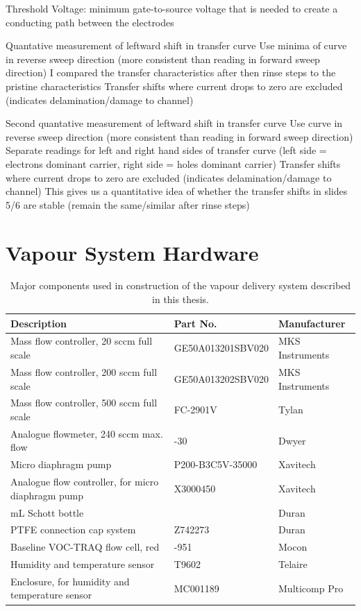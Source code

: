 \documentclass[
  a4paper,
]{scrbook}
\begin{document}
Threshold Voltage: minimum gate-to-source voltage that is needed to
create a conducting path between the electrodes

Quantative measurement of leftward shift in transfer curve Use minima of
curve in reverse sweep direction (more consistent than reading in
forward sweep direction) I compared the transfer characteristics after
then rinse steps to the pristine characteristics Transfer shifts where
current drops to zero are excluded (indicates delamination/damage to
channel)

Second quantative measurement of leftward shift in transfer curve Use
curve in reverse sweep direction (more consistent than reading in
forward sweep direction) Separate readings for left and right hand sides
of transfer curve (left side = electrons dominant carrier, right side =
holes dominant carrier) Transfer shifts where current drops to zero are
excluded (indicates delamination/damage to channel) This gives us a
quantitative idea of whether the transfer shifts in slides 5/6 are
stable (remain the same/similar after rinse steps)

\cleardoublepage
{}
{}
\appendix

\hypertarget{sec-vapour-sensor-components}{%
\chapter{Vapour System Hardware}\label{sec-vapour-sensor-components}}

\hypertarget{tbl-vapour-sensor-components}{}
\begin{longtable}[t]{>{\raggedright\arraybackslash}p{5.5cm}>{\raggedright\arraybackslash}p{4.5cm}>{\raggedright\arraybackslash}p{3.75cm}}
\caption{\label{tbl-vapour-sensor-components}Major components used in construction of the vapour delivery system
described in this thesis. }\tabularnewline

\toprule
Description & Part No. & Manufacturer\\
\midrule
Mass flow controller, 20 sccm full scale & GE50A013201SBV020 & MKS Instruments\\
Mass flow controller, 200 sccm full scale & GE50A013202SBV020 & MKS Instruments\\
Mass flow controller, 500 sccm full scale & FC-2901V & Tylan\\
Analogue flowmeter, 240 sccm max. flow & 116261-30 & Dwyer\\
Micro diaphragm pump & P200-B3C5V-35000 & Xavitech\\
\addlinespace
Analogue flow controller, for micro diaphragm pump & X3000450 & Xavitech\\
10 mL Schott bottle & 218010802 & Duran\\
PTFE connection cap system & Z742273 & Duran\\
Baseline VOC-TRAQ flow cell, red & 043-951 & Mocon\\
Humidity and temperature sensor & T9602 & Telaire\\
\addlinespace
Enclosure, for humidity and temperature sensor & MC001189 & Multicomp Pro\\
\bottomrule
\end{longtable}
\end{document}
